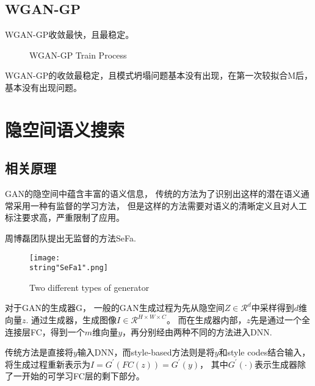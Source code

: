 \documentclass[UTF8]{ctexart}
\begin{document}
\subsection{WGAN-GP}
WGAN-GP收敛最快，且最稳定。
\begin{figure}[H]
    \centering
    \caption{WGAN-GP Train Process}
    \label{fig:7}
\end{figure}
WGAN-GP的收敛最稳定，且模式坍塌问题基本没有出现，在第一次较拟合M后，基本没有出现问题。\par

\section{隐空间语义搜索}

\subsection{相关原理}
GAN的隐空间中蕴含丰富的语义信息，
传统的方法为了识别出这样的潜在语义通常采用一种有监督的学习方法，
但是这样的方法需要对语义的清晰定义且对人工标注要求高，严重限制了应用。\par 
周博磊团队提出无监督的方法SeFa\cite{shen2021closed}.\par 
\begin{figure}[H]
    \begin{center}
        \texttt{[image: \\string"SeFa1".png]}
    \caption{Two different types of generator}
    \label{fig:8}
    \end{center}
    \end{figure}
\par
对于GAN的生成器G，
一般的GAN生成过程为先从隐空间$Z{\in}\mathcal{R}^{d}$中采样得到$d$维向量$z$.
通过生成器，生成图像$I{\in}\mathcal{R}^{H{\times}W{\times}C}$。
而在生成器内部，$z$先是通过一个全连接层FC，得到一个$m$维向量$y$，再分别经由两种不同的方法进入DNN.\par 
传统方法是直接将$y$输入DNN，而style-based方法则是将$y$和style codes结合输入，
将生成过程重新表示为$I=G^{'}(FC(z))=G^{'}(y)$，
其中$G^{'}(\cdot)$表示生成器除了一开始的可学习FC层的剩下部分。\par 
\end{document}
